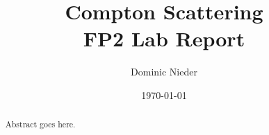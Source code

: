\documentclass[a4paper,12pt]{article}
\title{\textbf{Compton Scattering}\\[5pt]
\large FP2 Lab Report}
\author{Dominic Nieder}
\date{\today}
\begin{document}
\maketitle

\begin{abstract}
    Abstract goes here.
\end{abstract}

\tableofcontents
\newpage











\appendix

\printbibliography
\end{document}
